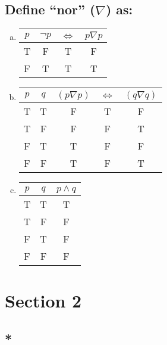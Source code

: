 \documentclass[12pt]{scrartcl} %
\begin{document}
\subsection{Define ``nor'' ($\nabla$) as:}

\begin{enumerate}[(a)]
	\item \begin{tabular}{*{1}{c}|*{3}{c}}$p$&$\neg p$&$\iff$&$p \nabla p$\\
			\hline	
			T&F&T&F\\
			F&T&T&T\\
			\end{tabular}	
	\item \begin{tabular}{*{2}{c}|*{3}{c}}$p$&$q$&$(p \nabla p)$&$\iff$&$(q \nabla q)$\\
			\hline
			T&T&F&T&F\\
			T&F&F&F&T\\
			F&T&T&F&F\\
			F&F&T&F&T\\
		  \end{tabular}
		  
	\item \begin{tabular}{*{2}{c}|*{1}{c}}$p$&$q$&$p \land q$\\
			\hline
			T&T&T\\
			T&F&F\\
			F&T&F\\
			F&F&F\\
		  \end{tabular}
\end{enumerate}

\section{Section 2}

\subsection{*}
\end{document}

